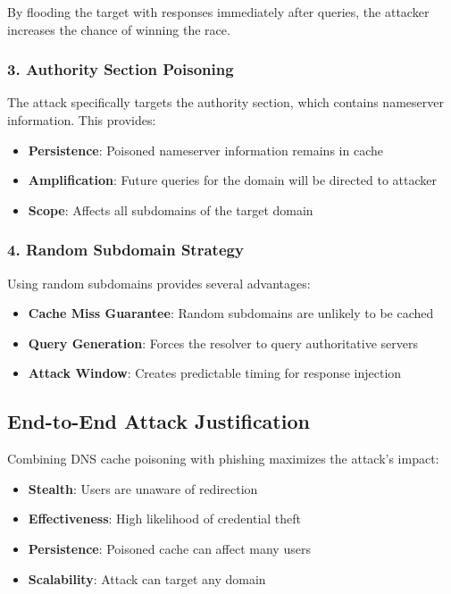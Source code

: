 \documentclass[12pt,a4paper]{article}
\begin{document}
By flooding the target with responses immediately after queries, the attacker increases the chance of winning the race.

\subsubsection{3. Authority Section Poisoning}

The attack specifically targets the authority section, which contains nameserver information. This provides:

\begin{itemize}
    \item \textbf{Persistence}: Poisoned nameserver information remains in cache
    \item \textbf{Amplification}: Future queries for the domain will be directed to attacker
    \item \textbf{Scope}: Affects all subdomains of the target domain
\end{itemize}

\subsubsection{4. Random Subdomain Strategy}

Using random subdomains provides several advantages:

\begin{itemize}
    \item \textbf{Cache Miss Guarantee}: Random subdomains are unlikely to be cached
    \item \textbf{Query Generation}: Forces the resolver to query authoritative servers
    \item \textbf{Attack Window}: Creates predictable timing for response injection
\end{itemize}

\subsection{End-to-End Attack Justification}

Combining DNS cache poisoning with phishing maximizes the attack's impact:
\begin{itemize}
    \item \textbf{Stealth}: Users are unaware of redirection
    \item \textbf{Effectiveness}: High likelihood of credential theft
    \item \textbf{Persistence}: Poisoned cache can affect many users
    \item \textbf{Scalability}: Attack can target any domain
\end{itemize}
\end{document}
